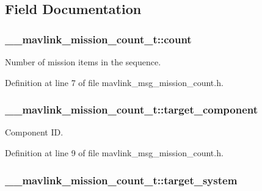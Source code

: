 \subsection{Field Documentation}
\hypertarget{struct____mavlink__mission__count__t_ae0f07b1c9ffca95b6c76cde724eda5d9}{
\subsubsection[{count}]{ \-\_\-\-\_\-mavlink\-\_\-mission\-\_\-count\-\_\-t\-::count}}\label{struct____mavlink__mission__count__t_ae0f07b1c9ffca95b6c76cde724eda5d9}


Number of mission items in the sequence. 



Definition at line 7 of file mavlink\-\_\-msg\-\_\-mission\-\_\-count.\-h.

\hypertarget{struct____mavlink__mission__count__t_a21576207ae6595d5272a405fb8c198bf}{
\subsubsection[{target\-\_\-component}]{ \-\_\-\-\_\-mavlink\-\_\-mission\-\_\-count\-\_\-t\-::target\-\_\-component}}\label{struct____mavlink__mission__count__t_a21576207ae6595d5272a405fb8c198bf}


Component I\-D. 



Definition at line 9 of file mavlink\-\_\-msg\-\_\-mission\-\_\-count.\-h.

\hypertarget{struct____mavlink__mission__count__t_a9e211af96b9dd62f71c32fb3412dbfca}{
\subsubsection[{target\-\_\-system}]{ \-\_\-\-\_\-mavlink\-\_\-mission\-\_\-count\-\_\-t\-::target\-\_\-system}}\label{struct____mavlink__mission__count__t_a9e211af96b9dd62f71c32fb3412dbfca}


